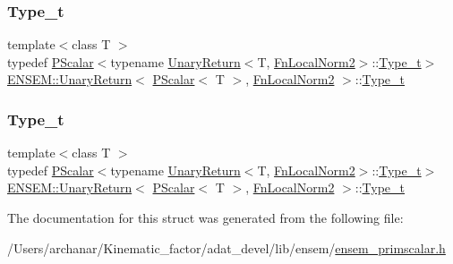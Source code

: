 \subsubsection{\texorpdfstring{Type\_t}{Type\_t}\hspace{0.1cm}{\footnotesize\ttfamily [1/2]}}
{\footnotesize\ttfamily template$<$class T $>$ \\
typedef \mbox{\hyperlink{classENSEM_1_1PScalar}{P\+Scalar}}$<$typename \mbox{\hyperlink{structENSEM_1_1UnaryReturn}{Unary\+Return}}$<$T, \mbox{\hyperlink{structENSEM_1_1FnLocalNorm2}{Fn\+Local\+Norm2}}$>$\+::\mbox{\hyperlink{structENSEM_1_1UnaryReturn_3_01PScalar_3_01T_01_4_00_01FnLocalNorm2_01_4_a852277c387f03da96f75945baafceac6}{Type\+\_\+t}}$>$ \mbox{\hyperlink{structENSEM_1_1UnaryReturn}{E\+N\+S\+E\+M\+::\+Unary\+Return}}$<$ \mbox{\hyperlink{classENSEM_1_1PScalar}{P\+Scalar}}$<$ T $>$, \mbox{\hyperlink{structENSEM_1_1FnLocalNorm2}{Fn\+Local\+Norm2}} $>$\+::\mbox{\hyperlink{structENSEM_1_1UnaryReturn_3_01PScalar_3_01T_01_4_00_01FnLocalNorm2_01_4_a852277c387f03da96f75945baafceac6}{Type\+\_\+t}}}

\mbox{\label{structENSEM_1_1UnaryReturn_3_01PScalar_3_01T_01_4_00_01FnLocalNorm2_01_4_a852277c387f03da96f75945baafceac6}} 
\subsubsection{\texorpdfstring{Type\_t}{Type\_t}\hspace{0.1cm}{\footnotesize\ttfamily [2/2]}}
{\footnotesize\ttfamily template$<$class T $>$ \\
typedef \mbox{\hyperlink{classENSEM_1_1PScalar}{P\+Scalar}}$<$typename \mbox{\hyperlink{structENSEM_1_1UnaryReturn}{Unary\+Return}}$<$T, \mbox{\hyperlink{structENSEM_1_1FnLocalNorm2}{Fn\+Local\+Norm2}}$>$\+::\mbox{\hyperlink{structENSEM_1_1UnaryReturn_3_01PScalar_3_01T_01_4_00_01FnLocalNorm2_01_4_a852277c387f03da96f75945baafceac6}{Type\+\_\+t}}$>$ \mbox{\hyperlink{structENSEM_1_1UnaryReturn}{E\+N\+S\+E\+M\+::\+Unary\+Return}}$<$ \mbox{\hyperlink{classENSEM_1_1PScalar}{P\+Scalar}}$<$ T $>$, \mbox{\hyperlink{structENSEM_1_1FnLocalNorm2}{Fn\+Local\+Norm2}} $>$\+::\mbox{\hyperlink{structENSEM_1_1UnaryReturn_3_01PScalar_3_01T_01_4_00_01FnLocalNorm2_01_4_a852277c387f03da96f75945baafceac6}{Type\+\_\+t}}}



The documentation for this struct was generated from the following file\+:\begin{DoxyCompactItemize}
\item 
/\+Users/archanar/\+Kinematic\+\_\+factor/adat\+\_\+devel/lib/ensem/\mbox{\hyperlink{lib_2ensem_2ensem__primscalar_8h}{ensem\+\_\+primscalar.\+h}}\end{DoxyCompactItemize}
